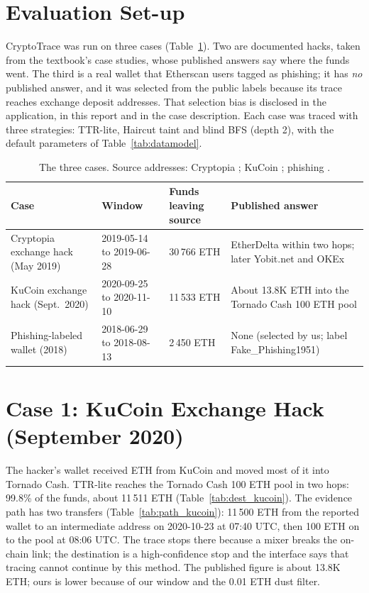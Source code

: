 \section{Evaluation Set-up}
\label{sec:evalsetup}
CryptoTrace was run on three cases (Table~\ref{tab:cases}). Two are documented hacks, taken from the textbook's case studies, whose published answers say where the funds went. The third is a real wallet that Etherscan users tagged as phishing; it has \emph{no} published answer, and it was selected from the public labels because its trace reaches exchange deposit addresses. That selection bias is disclosed in the application, in this report and in the case description. Each case was traced with three strategies: TTR-lite, Haircut taint and blind BFS (depth 2), with the default parameters of Table~\ref{tab:datamodel}.

\begin{table}[H]
\centering\small\singlespacing
\begin{tabular}{p{3.2cm} p{3.0cm} p{2.6cm} p{4.2cm}}
\toprule
\textbf{Case} & \textbf{Window} & \textbf{Funds leaving source} & \textbf{Published answer}\\
\midrule
Cryptopia exchange hack (May 2019) & 2019-05-14 to 2019-06-28 & 30\,766 ETH & EtherDelta within two hops; later Yobit.net and OKEx\\
KuCoin exchange hack (Sept.\ 2020) & 2020-09-25 to 2020-11-10 & 11\,533 ETH & About 13.8K ETH into the Tornado Cash 100 ETH pool\\
Phishing-labeled wallet (2018) & 2018-06-29 to 2018-08-13 & 2\,450 ETH & None (selected by us; label Fake\_Phishing1951)\\
\bottomrule
\end{tabular}
\caption{The three cases. Source addresses: Cryptopia ; KuCoin ; phishing .}
\label{tab:cases}
\end{table}

\section{Case 1: KuCoin Exchange Hack (September 2020)}
The hacker's wallet received ETH from KuCoin and moved most of it into Tornado Cash. TTR-lite reaches the Tornado Cash 100 ETH pool in two hops: 99.8\% of the funds, about 11\,511 ETH (Table~\ref{tab:dest_kucoin}). The evidence path has two transfers (Table~\ref{tab:path_kucoin}): 11\,500 ETH from the reported wallet to an intermediate address on 2020-10-23 at 07:40 UTC, then 100 ETH on to the pool at 08:06 UTC. The trace stops there because a mixer breaks the on-chain link; the destination is a high-confidence stop and the interface says that tracing cannot continue by this method. The published figure is about 13.8K ETH; ours is lower because of our window and the 0.01 ETH dust filter.

